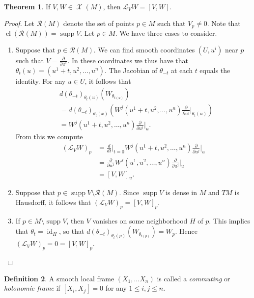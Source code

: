 \documentclass[10pt,letterpaper,cm]{nupset}
\theoremstyle{definition}
\newtheorem{definition}{Definition}[subsection]
\theoremstyle{theorem}
\newtheorem{theorem}[definition]{Theorem}
\theoremstyle{remark}
\newcommand{\1}{\mathbf{1}}
\newcommand{\0}{\vec 0}
\DeclareMathOperator{\id}{id}
\DeclareMathOperator{\supp}{supp}
\DeclareMathOperator{\cl}{cl}
\DeclareMathOperator{\vf}{\mathscr{X}}
\begin{document}
\begin{theorem}
If $V, W\in \vf(M)$, then $\mathcal{L}_VW = [V, W]$.
\end{theorem}
\begin{proof}
Let $\mathcal{R}(M)$ denote the set of points $p\in M$ such that $V_p\ne 0$. Note that $\cl\left(\mathcal{R}(M)\right) = \supp V$. Let $p\in M$. We have three cases to consider.
\begin{enumerate}[label=(\roman*)]
\item Suppose that $p\in \mathcal{R}(M)$. We can find smooth coordinates $\left(U, u^i\right)$ near $p$ such that $V= \frac{\partial}{\partial{u^1}}$. In these coordinates we thus have that $\theta_t(u) = \left(u^1 +t, u^2, \ldots, u^n\right)$. The Jacobian of ${\theta_{-t}}$ at each $t$ equals the identity. For any $u\in U$, it follows that
\begin{align*}
& d(\theta_{-t})_{\theta_t(u)}\left(W_{\theta_{t(u)}}\right)
\\ & = d(\theta_{-t})_{\theta_t(x)} \left(W^j(u^1 + t, u^2, \ldots, u^n)\frac{\partial}{\partial{u^j}}\bigr\rvert_{\theta_t(u)}\right)
\\ & = W^j(u^1 + t, u^2, \ldots, u^n)\frac{\partial}{\partial{u^j}}\bigr\rvert_{u}.
\end{align*}
From this we compute
\begin{align*}
 \left(\mathcal{L}_VW\right)_p &= \frac{d}{dt}\bigr\rvert_{t=0} W^j(u^1 + t, u^2, \ldots, u^n)\frac{\partial}{\partial{u^j}}\bigr\rvert_{u}
\\ & = \frac{\partial}{\partial{u^1}}W^j(u^1 , u^2, \ldots, u^n)\frac{\partial}{\partial{u^j}}\bigr\rvert_{u}
\\ & = \left[V, W\right]_u
.\end{align*}
\item Suppose that $p\in \supp V \setminus \mathcal{R}(M)$. Since $\supp V$ is dense in $M$ and $TM$ is Hausdorff, it follows that $\left(\mathcal{L}_VW\right)_p = \left[V, W\right]_p$.
\item If $p\in  M\setminus \supp V$, then $V$ vanishes on some neighborhood $H$ of $p$. This implies that $\theta_t = \id_H$, so that $d(\theta_{-t})_{\theta_t(p)}\left(W_{\theta_{t(p)}}\right) = W_p$. Hence $\left(\mathcal{L}_VW\right)_p =0 = [V, W]_p$.
\end{enumerate}
\end{proof}

\begin{definition}
A smooth local frame $\left(X_1, \ldots X_n\right)$ is called a \textit{commuting} or \textit{holonomic frame} if $\left[X_i, X_j\right]=0$ for any $1\leq i,j\leq n$.
\end{definition}
\end{document}

